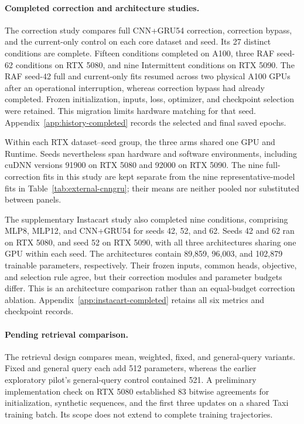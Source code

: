 \documentclass[runningheads]{llncs}
\begin{document}
\paragraph{Completed correction and architecture studies.}
The correction study compares full CNN+GRU54 correction, correction bypass, and the current-only control on each core dataset and seed. Its 27 distinct conditions are complete. Fifteen conditions completed on A100, three RAF seed-62 conditions on RTX 5080, and nine Intermittent conditions on RTX 5090. The RAF seed-42 full and current-only fits resumed across two physical A100 GPUs after an operational interruption, whereas correction bypass had already completed. Frozen initialization, inputs, loss, optimizer, and checkpoint selection were retained. This migration limits hardware matching for that seed. Appendix~\ref{app:history-completed} records the selected and final saved epochs.

Within each RTX dataset--seed group, the three arms shared one GPU and Runtime. Seeds nevertheless span hardware and software environments, including cuDNN versions 91900 on RTX 5080 and 92000 on RTX 5090. The nine full-correction fits in this study are kept separate from the nine representative-model fits in Table~\ref{tab:external-cnngru}; their means are neither pooled nor substituted between panels.

The supplementary Instacart study also completed nine conditions, comprising MLP8, MLP12, and CNN+GRU54 for seeds 42, 52, and 62. Seeds 42 and 62 ran on RTX 5080, and seed 52 on RTX 5090, with all three architectures sharing one GPU within each seed. The architectures contain 89,859, 96,003, and 102,879 trainable parameters, respectively. Their frozen inputs, common heads, objective, and selection rule agree, but their correction modules and parameter budgets differ. This is an architecture comparison rather than an equal-budget correction ablation. Appendix~\ref{app:instacart-completed} retains all six metrics and checkpoint records.

\paragraph{Pending retrieval comparison.}
The retrieval design compares mean, weighted, fixed, and general-query variants. Fixed and general query each add 512 parameters, whereas the earlier exploratory pilot's general-query control contained 521. A preliminary implementation check on RTX 5080 established 83 bitwise agreements for initialization, synthetic sequences, and the first three updates on a shared Taxi training batch. Its scope does not extend to complete training trajectories.
\end{document}
